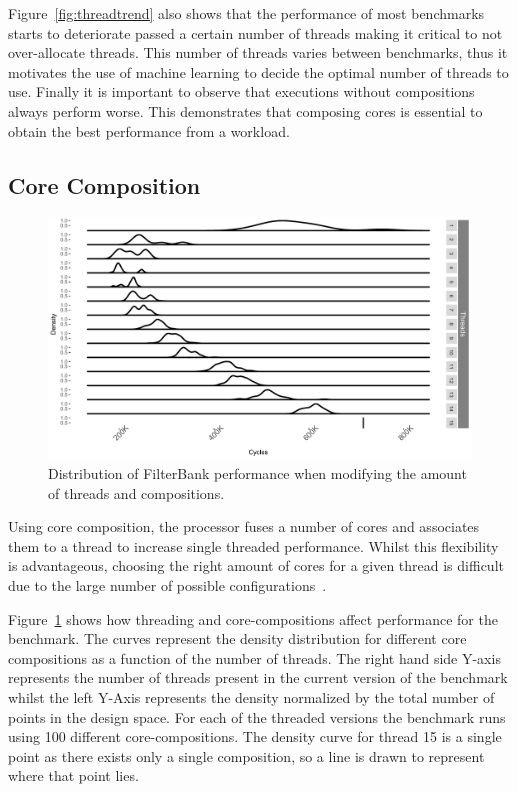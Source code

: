 Figure~\ref{fig:threadtrend} also shows that the performance of most benchmarks starts to deteriorate passed a certain number of threads making it critical to not over-allocate threads.
This number of threads varies between benchmarks, thus it motivates the use of machine learning to decide the optimal number of threads to use.
Finally it is important to observe that executions without compositions always perform worse.
This demonstrates that composing cores is essential to obtain the best performance from a workload.


\subsection{Core Composition}

\begin{figure}[t]
  \includegraphics[width=1\textwidth]{streamit-paper/graphics/filterbank_tot.pdf}
  \caption{Distribution of FilterBank performance when modifying the amount of threads and compositions.}\label{fig:fbtotal}
\end{figure}

Using core composition, the processor fuses a number of cores and associates them to a thread to increase single threaded performance.
Whilst this flexibility is advantageous, choosing the right amount of cores for a given thread is difficult due to the large number of possible configurations~\cite{gulati2008multitaskingdmc}.

Figure~\ref{fig:fbtotal} shows how threading and core-compositions affect performance for the  benchmark.
The curves represent the density distribution for different core compositions as a function of the number of threads.
The right hand side Y-axis represents the number of threads present in the current version of the benchmark whilst the left Y-Axis represents the density normalized by the total number of points in the design space.
For each of the threaded versions the benchmark runs using 100 different core-compositions.
The density curve for thread 15 is a single point as there exists only a single composition, so a line is drawn to represent where that point lies.

